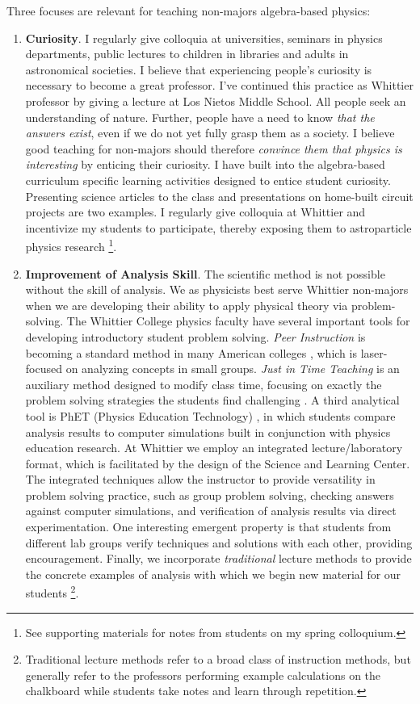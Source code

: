 \documentclass[../../main.tex]{subfiles}
\begin{document}
Three focuses are relevant for teaching non-majors algebra-based physics:
\begin{enumerate}
\item \textbf{Curiosity}.  I regularly give colloquia at universities, seminars in physics departments, public lectures to children in libraries and adults in astronomical societies.  I believe that experiencing people's curiosity is necessary to become a great professor.  I've continued this practice as Whittier professor by giving a lecture at Los Nietos Middle School.  All people seek an understanding of nature.  Further, people have a need to know \textit{that the answers exist}, even if we do not yet fully grasp them as a society.  I believe good teaching for non-majors should therefore \textit{convince them that physics is interesting} by enticing their curiosity.  I have built into the algebra-based curriculum specific learning activities designed to entice student curiosity.  Presenting science articles to the class and presentations on home-built circuit projects are two examples.  I regularly give colloquia at Whittier and incentivize my students to participate, thereby exposing them to astroparticle physics research \footnote{See supporting materials for notes from students on my spring colloquium.}.

\item \textbf{Improvement of Analysis Skill}.  The scientific method is not possible without the skill of analysis.  We as physicists best serve Whittier non-majors when we are developing their ability to apply physical theory via problem-solving.  The Whittier College physics faculty have several important tools for developing introductory student problem solving.  \textit{Peer Instruction} is becoming a standard method in many American colleges \cite{mazur}, which is laser-focused on analyzing concepts in small groups.  \textit{Just in Time Teaching} is an auxiliary method designed to modify class time, focusing on exactly the problem solving strategies the students find challenging \cite{howpeoplelearn}.  A third analytical tool is PhET (Physics Education Technology) \cite{phet}, in which students compare analysis results to computer simulations built in conjunction with physics education research.  At Whittier we employ an integrated lecture/laboratory format, which is facilitated by the design of the Science and Learning Center.  The integrated techniques allow the instructor to provide versatility in problem solving practice, such as group problem solving, checking answers against computer simulations, and verification of analysis results via direct experimentation.  One interesting emergent property is that students from different lab groups verify techniques and solutions with each other, providing encouragement.  Finally, we incorporate \textit{traditional} lecture methods to provide the concrete examples of analysis with which we begin new material for our students \footnote{Traditional lecture methods refer to a broad class of instruction methods, but generally refer to the professors performing example calculations on the chalkboard while students take notes and learn through repetition.}.


\end{enumerate}
\end{document}
